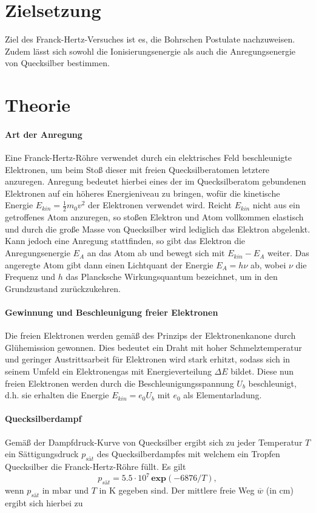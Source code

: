 \section{Zielsetzung}
\label{sec:Ziel}
Ziel des Franck-Hertz-Versuches ist es, die Bohrschen Postulate nachzuweisen.
Zudem lässt sich sowohl die Ionisierungsenergie als auch die Anregungsenergie von Quecksilber bestimmen.

\section{Theorie}
\label{sec:Theorie}

\paragraph{Art der Anregung}
Eine Franck-Hertz-Röhre verwendet durch ein elektrisches Feld beschleunigte Elektronen,
um beim Stoß dieser mit freien Quecksilberatomen letztere anzuregen. Anregung bedeutet
hierbei eines der im Quecksilberatom gebundenen Elektronen auf ein höheres Energieniveau
zu bringen, wofür die kinetische Energie $E_{kin} = \frac{1}{2} m_0 v^2$ der Elektronen
verwendet wird. Reicht $E_{kin}$ nicht aus ein getroffenes Atom anzuregen, so stoßen
Elektron und Atom vollkommen elastisch und durch die große Masse von Quecksilber
wird lediglich das Elektron abgelenkt. Kann jedoch eine Anregung stattfinden,
so gibt das Elektron die Anregungsenergie $E_A$ an das Atom ab und bewegt sich
mit $E_{kin} - E_A$ weiter. Das angeregte Atom gibt dann einen Lichtquant der
Energie $E_A=h \nu$ ab, wobei $\nu$ die Frequenz und $h$ das Plancksche
Wirkungsquantum bezeichnet, um in den Grundzustand zurückzukehren.

\paragraph{Gewinnung und Beschleunigung freier Elektronen}
Die freien Elektronen werden gemäß des Prinzips der Elektronenkanone durch
Glühemission gewonnen. Dies bedeutet ein Draht mit hoher Schmelztemperatur
und geringer Austrittsarbeit für Elektronen wird stark erhitzt, sodass sich
in seinem Umfeld ein Elektronengas mit Energieverteilung $\Delta E$ bildet.
Diese nun freien Elektronen werden durch die Beschleunigungsspannung $U_b$
beschleunigt, d.h. sie erhalten die Energie $E_{kin} = e_0 U_b$ mit $e_0$
als Elementarladung.

\paragraph{Quecksilberdampf}
Gemäß der Dampfdruck-Kurve von Quecksilber ergibt sich zu jeder Temperatur $T$ ein Sättigungsdruck $p_{sät}$ des Quecksilberdampfes mit welchem ein Tropfen Quecksilber die Franck-Hertz-Röhre füllt.
Es gilt
\begin{equation}
  \label{eqn:p}
  p_{sät} = 5.5\cdot10^7 \, \textbf{exp} \left( -6876/T \right),
\end{equation}
wenn $p_{sät}$ in $\si{\milli \bar}$ und $T$ in $\si{\kelvin}$ gegeben sind.
Der mittlere freie Weg $\overline{w}$ (in $\si{\centi \meter}$) ergibt sich hierbei zu

